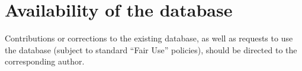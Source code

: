 \documentclass[letterpaper,review,authoryear,12pt]{elsarticle}
\begin{document}




\newpage

\section*{Availability of the database} 
Contributions or corrections to the existing database, as well as
requests to use the database (subject to standard ``Fair Use''
policies), should be directed to the corresponding author. 
\end{document}

